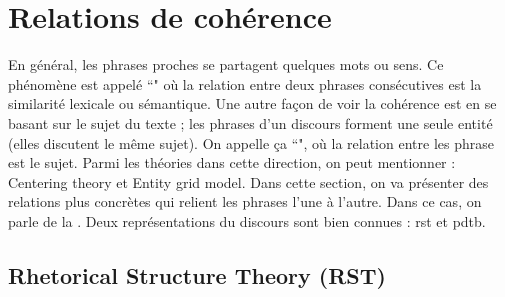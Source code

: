 \documentclass{KodeBook}
\begin{document}
\section{Relations de cohérence}

En général, les phrases proches se partagent quelques mots ou sens. 
Ce phénomène est appelé ``" où la relation entre deux phrases consécutives est la similarité lexicale ou sémantique.
Une autre façon de voir la cohérence est en se basant sur le sujet du texte ; les phrases d'un discours forment une seule entité (elles discutent le même sujet). 
On appelle ça ``", où la relation entre les phrase est le sujet. 
Parmi les théories dans cette direction, on peut mentionner : Centering theory et Entity grid model. 
Dans cette section, on va présenter  des relations plus concrètes qui relient les phrases l'une à l'autre. 
Dans ce cas, on parle de la . 
Deux représentations du discours sont bien connues : \ac{rst} et \ac{pdtb}.

\vfill

\subsection{Rhetorical Structure Theory (RST)}
\end{document}
